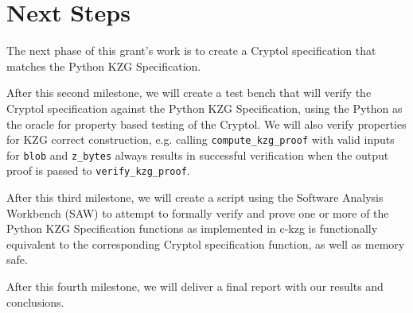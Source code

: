 \documentclass[12pt]{galois-whitepaper}
\begin{document}
\clearpage

\section{Next Steps}
The next phase of this grant's work is to create a Cryptol specification that matches the Python KZG Specification.

After this second milestone, we will create a test bench that will verify the Cryptol specification against the Python KZG Specification, 
using the Python as the oracle for property based testing of the Cryptol. We will also verify properties for KZG correct construction,
e.g. calling \texttt{compute\_kzg\_proof} with valid inputs for \texttt{blob} and \texttt{z\_bytes} always results in successful 
verification when the output proof is passed to \texttt{verify\_kzg\_proof}.

After this third milestone, we will create a script using the Software Analysis Workbench (SAW) to attempt to formally verify and 
prove one or more of the Python KZG Specification functions as implemented in c-kzg is functionally equivalent to the corresponding Cryptol 
specification function, as well as memory safe.

After this fourth milestone, we will deliver a final report with our results and conclusions.
\end{document}
